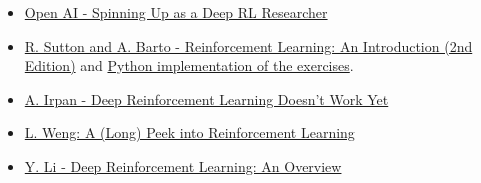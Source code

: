 \documentclass[12pt, english]{article}
\begin{document}
\begin{itemize}
  \item \href{https://spinningup.openai.com/en/latest/spinningup/spinningup.html}{Open AI - Spinning Up as a Deep RL Researcher}
  \item \href{http://incompleteideas.net/book/the-book-2nd.html}{R. Sutton and A. Barto - Reinforcement Learning: An Introduction (2nd Edition)} and \href{https://github.com/ShangtongZhang/reinforcement-learning-an-introduction}{Python implementation of the exercises}.
  \item \href{https://www.alexirpan.com/2018/02/14/rl-hard.html}{A. Irpan - Deep Reinforcement Learning Doesn't Work Yet}
  \item \href{https://lilianweng.github.io/lil-log/2018/02/19/a-long-peek-into-reinforcement-learning.html}{L. Weng: A (Long) Peek into Reinforcement Learning}
  \item \href{http://arxiv.org/abs/1701.07274}{Y. Li - Deep Reinforcement Learning: An Overview}
\end{itemize}







\end{document}
